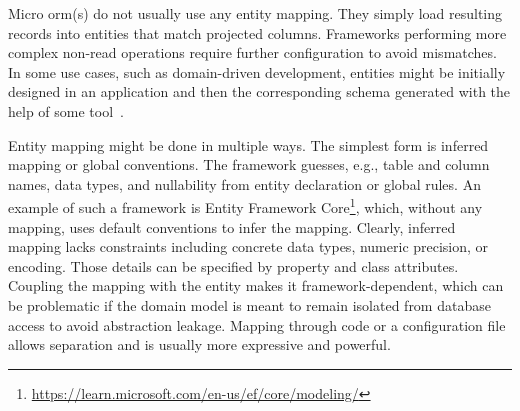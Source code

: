 Micro \acrshort{orm}(s) do not usually use any entity mapping. They simply load resulting records into entities that match projected columns. Frameworks performing more complex non-read operations require further configuration to avoid mismatches. In some use cases, such as domain-driven development, entities might be initially designed in an application and then the corresponding schema generated with the help of some tool~\cite{FowlerDDD}.

Entity mapping might be done in multiple ways. The simplest form is inferred mapping or global conventions. The framework guesses, e.g., table and column names, data types, and nullability from entity declaration or global rules. An example of such a framework is Entity Framework Core\footnote{\url{https://learn.microsoft.com/en-us/ef/core/modeling/}}, which, without any mapping, uses default conventions to infer the mapping. Clearly, inferred mapping lacks constraints including concrete data types, numeric precision, or encoding. Those details can be specified by property and class attributes. Coupling the mapping with the entity makes it framework-dependent, which can be problematic if the domain model is meant to remain isolated from database access to avoid abstraction leakage. Mapping through code or a configuration file allows separation and is usually more expressive and powerful.

